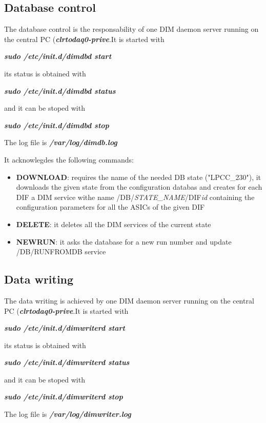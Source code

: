 \documentclass[english]{article}
\begin{document}
\subsection{Database control}

The database control is the responsability of one DIM daemon server running on the central PC ({\bf \sl clrtodaq0-prive}.It is started with

{\sl \bf sudo /etc/init.d/dimdbd start }

its status is obtained with 

{\sl \bf sudo /etc/init.d/dimdbd status }

and it can be stoped with

{\sl \bf sudo /etc/init.d/dimdbd stop }
 
 The log file is {\sl \bf /var/log/dimdb.log }
 
 It acknowlegdes the following commands:
 \begin{itemize}
\item {\bf DOWNLOAD}: requires the name of the needed DB state ("LPCC\_230"), it downloads the given state from the configuration databas and creates for each DIF a DIM service withe name /DB/{\sl STATE\_NAME}/DIF{\sl id} containing the configuration parameters for all the ASICs of the given DIF 
\item {\bf DELETE}: it deletes all the DIM services of the current state
\item {\bf NEWRUN}: it asks the database for a new run number and update /DB/RUNFROMDB service

\end{itemize}

\subsection {Data writing}

The data writing is achieved by one DIM daemon server running on the central PC ({\bf \sl clrtodaq0-prive}.It is started with

{\sl \bf sudo /etc/init.d/dimwriterd start }

its status is obtained with 

{\sl \bf sudo /etc/init.d/dimwriterd status }

and it can be stoped with

{\sl \bf sudo /etc/init.d/dimwriterd stop }
 
 The log file is {\sl \bf /var/log/dimwriter.log }
 
\end{document}
